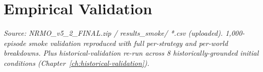 \part{Empirical Validation}
\noindent\textit{Source: NRMO\_v5\_2\_FINAL.zip / results\_smoke/
*.csv (uploaded). 1,000-episode smoke validation reproduced
with full per-strategy and per-world breakdowns. Plus
historical-validation re-run across 8 historically-grounded
initial conditions (Chapter~\ref{ch:historical-validation}).}



